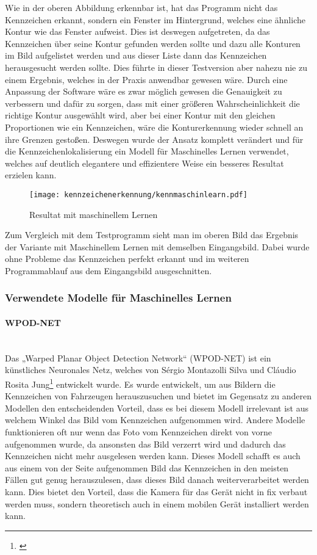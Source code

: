 Wie in der oberen Abbildung erkennbar ist, hat das Programm nicht das Kennzeichen erkannt, sondern ein Fenster im Hintergrund, welches eine ähnliche Kontur 
wie das Fenster aufweist. Dies ist deswegen aufgetreten, da das Kennzeichen über seine Kontur gefunden werden sollte und dazu alle Konturen im Bild aufgelistet 
werden und aus dieser Liste dann das Kennzeichen herausgesucht werden sollte. Dies führte in dieser Testversion aber nahezu nie zu einem Ergebnis, welches in 
der Praxis anwendbar gewesen wäre. Durch eine Anpassung der Software wäre es zwar möglich gewesen die Genauigkeit zu verbessern und dafür zu sorgen, dass mit 
einer größeren Wahrscheinlichkeit die richtige Kontur ausgewählt wird, aber bei einer Kontur mit den gleichen Proportionen wie ein Kennzeichen, wäre die Konturerkennung 
wieder schnell an ihre Grenzen gestoßen. Deswegen wurde der Ansatz komplett verändert und für die Kennzeichenlokalisierung ein Modell für Maschinelles Lernen 
verwendet, welches auf deutlich elegantere und effizientere Weise ein besseres Resultat erzielen kann.

\begin{figure}[H]
    \centering
    \texttt{[image: kennzeichenerkennung/kennmaschinlearn.pdf]}
    \caption{Resultat mit maschinellem Lernen}
\end{figure}

Zum Vergleich mit dem Testprogramm sieht man im oberen Bild das Ergebnis der Variante mit Maschinellem Lernen mit demselben Eingangsbild. Dabei wurde ohne 
Probleme das Kennzeichen perfekt erkannt und im weiteren Programmablauf aus dem Eingangsbild ausgeschnitten.

\subsubsection{Verwendete Modelle für Maschinelles Lernen}

\paragraph{WPOD-NET}\mbox{}\\
Das „Warped Planar Object Detection Network“ (WPOD-NET) ist ein künstliches Neuronales Netz, welches von Sérgio Montazolli Silva und 
Cláudio Rosita Jung\footnote{\cite{wpodnet}}
entwickelt wurde. Es wurde entwickelt, um aus Bildern die Kennzeichen von Fahrzeugen herauszusuchen und bietet im Gegensatz zu anderen Modellen den entscheidenden 
Vorteil, dass es bei diesem Modell irrelevant ist aus welchem Winkel das Bild vom Kennzeichen aufgenommen wird. Andere Modelle funktionieren oft nur wenn das Foto 
vom Kennzeichen direkt von vorne aufgenommen wurde, da ansonsten das Bild verzerrt wird und dadurch das Kennzeichen nicht mehr ausgelesen werden kann. Dieses Modell 
schafft es auch aus einem von der Seite aufgenommen Bild das Kennzeichen in den meisten Fällen gut genug herauszulesen, dass dieses Bild danach weiterverarbeitet 
werden kann. Dies bietet den Vorteil, dass die Kamera für das Gerät nicht in fix verbaut werden muss, sondern theoretisch auch in einem mobilen Gerät installiert werden kann.\\

